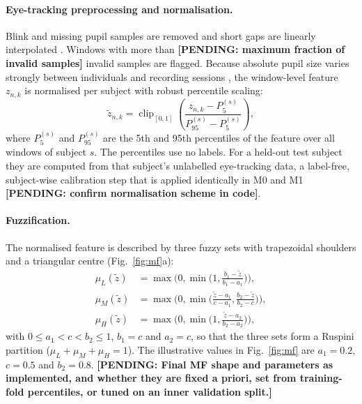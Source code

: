 \documentclass[11pt,a4paper]{article}
\newcommand{\pending}[1]{\textcolor{red!75!black}{\textbf{[PENDING: #1]}}}
\begin{document}
\paragraph{Eye-tracking preprocessing and normalisation.}
Blink and missing pupil samples are removed and short gaps are linearly interpolated \cite{Kret2019}. Windows with more than \pending{maximum fraction of invalid samples} invalid samples are flagged. Because absolute pupil size varies strongly between individuals and recording sessions \cite{Mathot2018}, the window-level feature $z_{n,k}$ is normalised per subject with robust percentile scaling:
\begin{equation}
\tilde z_{n,k} = \operatorname{clip}_{[0,1]}\left(\frac{z_{n,k}-P_{5}^{(s)}}{P_{95}^{(s)}-P_{5}^{(s)}}\right),
\label{eq:norm}
\end{equation}
where $P_{5}^{(s)}$ and $P_{95}^{(s)}$ are the 5th and 95th percentiles of the feature over all windows of subject $s$. The percentiles use no labels. For a held-out test subject they are computed from that subject's unlabelled eye-tracking data, a label-free, subject-wise calibration step that is applied identically in M0 and M1 \pending{confirm normalisation scheme in code}.

\paragraph{Fuzzification.}
The normalised feature is described by three fuzzy sets with trapezoidal shoulders and a triangular centre (Fig.~\ref{fig:mf}a):
\begin{align}
\mu_{L}(\tilde z) &= \max\!\Big(0,\min\!\Big(1,\frac{b_1-\tilde z}{b_1-a_1}\Big)\Big),\\
\mu_{M}(\tilde z) &= \max\!\Big(0,\min\!\Big(\frac{\tilde z-a_1}{c-a_1},\frac{b_2-\tilde z}{b_2-c}\Big)\Big),\\
\mu_{H}(\tilde z) &= \max\!\Big(0,\min\!\Big(1,\frac{\tilde z-a_2}{b_2-a_2}\Big)\Big),
\end{align}
with $0\le a_1<c<b_2\le1$, $b_1=c$ and $a_2=c$, so that the three sets form a Ruspini partition ($\mu_L+\mu_M+\mu_H=1$). The illustrative values in Fig.~\ref{fig:mf} are $a_1=0.2$, $c=0.5$ and $b_2=0.8$. \pending{Final MF shape and parameters as implemented, and whether they are fixed a priori, set from training-fold percentiles, or tuned on an inner validation split.}
\end{document}
